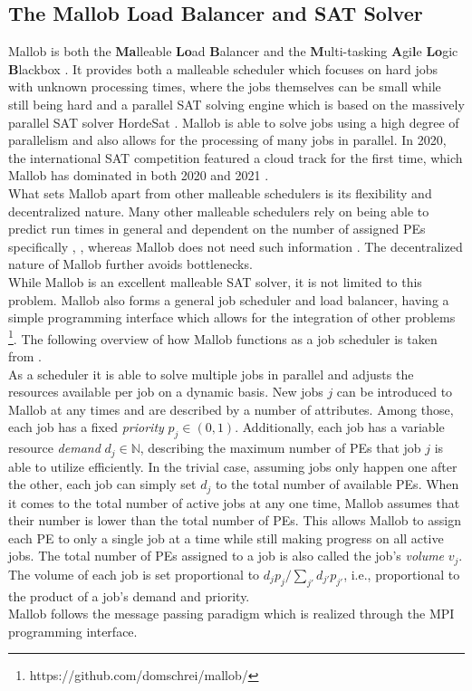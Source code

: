 \subsection{The Mallob Load Balancer and SAT Solver}
\label{prelim: mallob}
Mallob is both the \textbf{Ma}lleable \textbf{Lo}ad \textbf{B}alancer and the \textbf{M}ulti-tasking \textbf{A}gi\textbf{l}e \textbf{Lo}gic \textbf{B}lackbox \cite{schreiber2021scalable}.
It provides both a malleable scheduler which focuses on hard jobs with unknown processing times, where the jobs themselves can be small while still being hard \cite{sanders2022decentralized} and a parallel SAT solving engine which is based on the massively parallel SAT solver HordeSat \cite{balyo2015hordesat}.
Mallob is able to solve jobs using a high degree of parallelism and also allows for the processing of many jobs in parallel. In 2020, the international SAT competition featured a cloud track for the first time, which Mallob has dominated in both 2020 and 2021 \cite{froleyks2021sat, behnke2021satresults}. \\
What sets Mallob apart from other malleable schedulers is its flexibility and decentralized nature. Many other malleable schedulers rely on being able to predict run times in general and dependent on the number of assigned PEs specifically \cite{blazewicz2006preemptable}, \cite{sanders2011efficient}, whereas Mallob does not need such information \cite{sanders2022decentralized}. The decentralized nature of Mallob further avoids bottlenecks.
\\
While Mallob is an excellent malleable SAT solver, it is not limited to this problem. Mallob also forms a general job scheduler and load balancer, having a simple programming interface which allows for the integration of other problems \footnote{https://github.com/domschrei/mallob/}. The following overview of how Mallob functions as a job scheduler is taken from \cite{schreiber2021scalable}. \\
As a scheduler it is able to solve multiple jobs in parallel and adjusts the resources available per job on a dynamic basis. New jobs $j$ can be introduced to Mallob at any times and are described by a number of attributes. Among those, each job has a fixed \textit{priority} $p_j \in (0, 1)$. Additionally, each job has a variable resource \textit{demand} $d_j \in \mathbb{N}$, describing the maximum number of PEs that job $j$ is able to utilize efficiently. In the trivial case, assuming jobs only happen one after the other, each job can simply set $d_j$ to the total number of available PEs. When it comes to the total number of active jobs at any one time, Mallob assumes that their number is lower than the total number of PEs. This allows Mallob to assign each PE to only a single job at a time while still making progress on all active jobs. The total number of PEs assigned to a job is also called the job's \textit{volume} $v_j$. The volume of each job is set proportional to $d_j p_j / \sum_{j'} d_{j'} p_{j'}$, i.e., proportional to the product of a job's demand and priority.\\
Mallob follows the message passing paradigm which is realized through the MPI programming interface.

